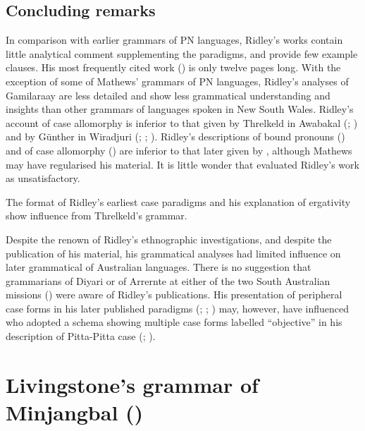 \subsection{Concluding remarks}
\label{sec:key:4.5.6}

In comparison with earlier grammars of PN languages, Ridley’s works contain little analytical comment supplementing the paradigms, and provide few example clauses. His most frequently cited work (\citeyear{ridley_kamilaroi_1875}) is only twelve pages long. With the exception of some of Mathews' grammars of PN languages, Ridley’s analyses of Gamilaraay are less detailed and show less grammatical understanding and insights than other grammars of languages spoken in New South Wales. Ridley’s account of case allomorphy is inferior to that given by Threlkeld in Awabakal (\citeyear{threlkeld_australian_1834}; ) and by Günther in Wiradjuri (\citeyear{gunther_native_1838}; \citeyear{gunther_lecture_1840}; ). Ridley’s descriptions of bound pronouns () and of case allomorphy () are inferior to that later given by \citet{mathews_languages_1903}, although Mathews may have regularised his material. It is little wonder that \citet{ray_aboriginal_1925} evaluated Ridley’s work as unsatisfactory.

The format of Ridley’s earliest case paradigms and his explanation of ergativity show influence from Threlkeld’s grammar. 

Despite the renown of Ridley’s ethnographic investigations, and despite the publication of his material, his grammatical analyses had limited influence on later grammatical of Australian languages. There is no suggestion that grammarians of Diyari or of Arrernte at either of the two South Australian missions () were aware of Ridley’s publications. His presentation of peripheral case forms in his later published paradigms (\citeyear{ridley_kamilaroi_1866}; \citeyear{ridley_kamilaroi_1875}; ) may, however, have influenced \citet{roth_ethnological_1897} who adopted a schema showing multiple case forms labelled “objective” in his description of Pitta-Pitta case (\citeyear[4]{roth_ethnological_1897}; ).

\section{Livingstone’s grammar of Minjangbal (\citeyear{livingstone_grammar_1892})}
\label{sec:key:4.6}

